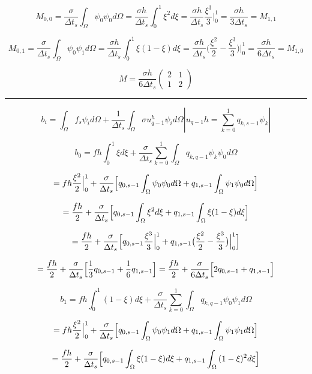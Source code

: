 \documentclass[12pt, a4paper]{article}
\begin{document}
\[ M_{0,0} = \frac{\sigma}{\Delta t_s}\int_{\Omega}{\psi_0\psi_0d\Omega} =
\frac{\sigma h}{\Delta t_s} \int_0^1{\xi^2 d\xi } =
\frac{\sigma h}{\Delta t_s} \frac{\xi^3}{3}\Bigr|_{0}^{1} = \frac{\sigma h}{3 \Delta t_s} = M_{1,1}
\]

\[ M_{0,1} = \frac{\sigma}{\Delta t_s}\int_{\Omega}{\psi_0\psi_1d\Omega} =
\frac{\sigma h}{\Delta t_s} \int_0^1{\xi(1-\xi) d\xi } =
\frac{\sigma h}{\Delta t_s} \bigl( \frac{\xi^2}{2} - \frac{\xi^3}{3} \bigr) \Bigr|_{0}^{1} = \frac{\sigma h}{6 \Delta t_s} = M_{1,0}
\]

\[ M = \frac{\sigma h}{6 \Delta t_s}\begin{pmatrix} 2 & 1 \\ 1 & 2 \end{pmatrix} \]
\par\noindent\rule{\textwidth}{0.4pt}

\[ b_i = \int_{\Omega}{f_s\psi_i d\Omega}+\frac{1}{\Delta t_s}\int_{\Omega}{\sigma u_{q-1}^h \psi_id\Omega} \left | u_{q-1}{h} = \sum_{k=0}^1{q_{k,s-1}\psi_k} \right |
\]

\[ b_0 = fh\int_{0}^{1}{\xi d\xi}+\frac{\sigma}{\Delta t_s}\sum_{k=0}^{1} \int_{\Omega}{q_{k,q-1} \psi_k \psi_0 d\Omega}
\]

\[ =fh\frac{\xi^2}{2}\Bigr|_{0}^{1} + \frac{\sigma}{\Delta t_s}\Bigl[ q_{0,s-1}\int_{\Omega}{\psi_0 \psi_0 d\Omega} + q_{1,s-1}\int_{\Omega}{\psi_1 \psi_0 d\Omega} \Bigr]
\]

\[ =\frac{fh}{2} + \frac{\sigma}{\Delta t_s}\Bigl[ q_{0,s-1}\int_{\Omega}{\xi^2 d\xi} + q_{1,s-1}\int_{\Omega}{\xi (1-\xi) d\xi} \Bigr]
\]

\[ =\frac{fh}{2} + \frac{\sigma}{\Delta t_s} \Bigl[ q_{0,s-1}\frac{\xi^3}{3} \Bigr|_{0}^{1} + q_{1,s-1}\bigl( \frac{\xi^2}{2} - \frac{\xi^3}{3} \bigr) \Bigr|_{0}^{1} \Bigr]
\]

\[ =\frac{fh}{2} + \frac{\sigma}{\Delta t_s} \Bigl[ \frac{1}{3}q_{0,s-1} + \frac{1}{6}q_{1,s-1} \Bigr]
=\frac{fh}{2} + \frac{\sigma}{6 \Delta t_s} \Bigl[ 2q_{0,s-1} + q_{1,s-1} \Bigr]
\]

\[ b_1 = fh\int_{0}^{1}{(1-\xi) d\xi}+\frac{\sigma}{\Delta t_s}\sum_{k=0}^{1} \int_{\Omega}{q_{k,q-1} \psi_0 \psi_1 d\Omega}
\]

\[=fh\frac{\xi^2}{2}\Bigr|_{0}^{1} + \frac{\sigma}{\Delta t_s}\Bigl[ q_{0,s-1}\int_{\Omega}{\psi_0 \psi_1 d\Omega} + q_{1,s-1}\int_{\Omega}{\psi_1 \psi_1 d\Omega} \Bigr]
\]

\[=\frac{fh}{2} + \frac{\sigma}{\Delta t_s}\Bigl[ q_{0,s-1}\int_{\Omega}{\xi (1-\xi) d\xi} + q_{1,s-1}\int_{\Omega}{(1-\xi)^2 d\xi} \Bigr]
\]
\end{document}
